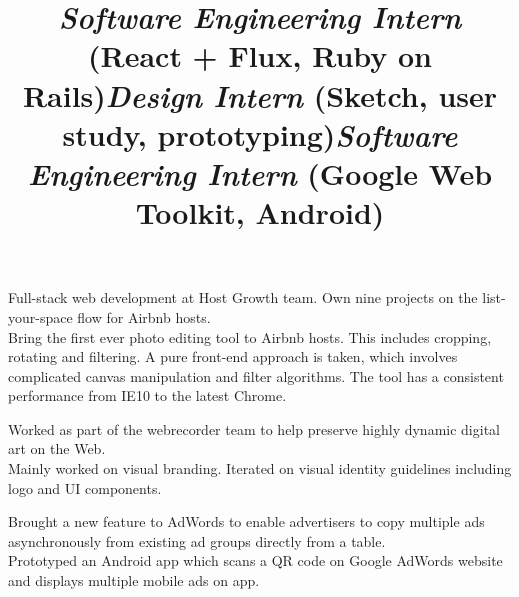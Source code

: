 \begin{resume}
\title{\textsl{Software Engineering Intern} (React + Flux, Ruby on Rails)}
\begin{position}
Full-stack web development at Host Growth team. Own nine projects on the list-your-space flow for Airbnb hosts. \\
Bring the first ever photo editing tool to Airbnb hosts. This includes cropping, rotating and filtering. A pure front-end approach is taken, which involves complicated canvas manipulation and filter algorithms. The tool has a consistent performance from IE10 to the latest Chrome.
\end{position}

\title{\textsl{Design Intern} (Sketch, user study, prototyping)}
\begin{position}
Worked as part of the webrecorder team to help preserve highly dynamic digital art on the Web. \\
Mainly worked on visual branding. Iterated on visual identity guidelines including logo and UI components.
\end{position}

\title{\textsl{Software Engineering Intern} (Google Web Toolkit, Android)}
\begin{position}
Brought a new feature to AdWords to enable advertisers to copy multiple ads asynchronously from existing ad groups directly from a table. \\
Prototyped an Android app which scans a QR code on Google AdWords website and displays multiple mobile ads on app.

\end{position}




\begin{formatb}
  \\
  \body\\
\end{formatb}


\end{resume}
